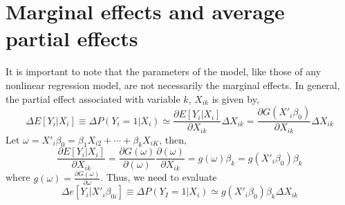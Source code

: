 \section{Marginal effects and average partial effects}

It is important to note that the parameters of the model, like those of any nonlinear regression model,
are not necessarily the marginal effects. In general,  the partial effect associated with variable $k$, $X_{ik}$ is given by,
\begin{equation}
    \Delta E[Y_i|X_i] \equiv \Delta P(Y_i = 1|X_i) \simeq \frac{\partial E[Y_i|X_i]}{\partial X_{ik}}\Delta X_{ik} = \frac{\partial G(X'_i\beta_0)}{\partial X_{ik}}\Delta X_{ik}
\end{equation}
Let $\omega = X'_i\beta_0 = \beta_1X_{i2}+\cdots+\beta_k X_{iK}$, then,
\begin{equation}
    \frac{\partial E[Y_i|X_i]}{\partial X_{ik}} = \frac{\partial G(\omega)}{\partial(\omega)}\frac{\partial(\omega)}{\partial X_{ik}}
    = g(\omega)\beta_k = g(X'_i\beta_0)\beta_k
\end{equation}
where $g(\omega) = \frac{\partial G(\omega)}{\partial\omega}$. Thus, we need to evaluate
\begin{equation}
    \Delta e[Y_i | X'_i\beta_{0i}] \equiv \Delta P(Y_I=1|X_i) \simeq g(X'_i\beta_0)\beta_k\Delta X_{ik}
\end{equation}

